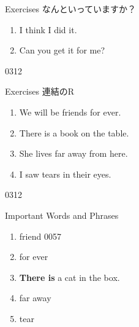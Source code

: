 \documentclass[aspectratio=169,xcolor={dvipsnames,table}]{beamer}
\begin{document}
\begin{frame}[plain]{Exercises}
  なんといっていますか？

  \Large
  \begin{enumerate}
    \item<2-> I think \only<3->{\textcolor{Maroon}{\textbottomtiebar\ }} I did  it.
    \item<5-> Can \only<6->{\textcolor{Maroon}{\textbottomtiebar\ }} you get  it for me?
  \end{enumerate}

  \hfill{\tiny 0312}\,{\scriptsize {}}
\end{frame}
\begin{frame}[plain]{Exercises}
  連結のR

  \Large
  \begin{enumerate}
    \item We will be friends for  ever.
    \item There  is a book on the table.
    \item She lives far  away from here.
    \item I saw tears  in their  eyes.
  \end{enumerate}

  \hfill{\tiny 0312}\,{\scriptsize {}}
\end{frame}
\begin{frame}[plain]{Important Words and Phrases}
  \Large
  \begin{enumerate}\setlength{\itemsep}{-1pt}
    \item friend
          \hfill{\tiny 0057}\,{\scriptsize {}}
    \item for ever
    \item \textbf{There is} a cat in the box.
    \item far away
    \item tear
  \end{enumerate}

\end{frame}
\end{document}
